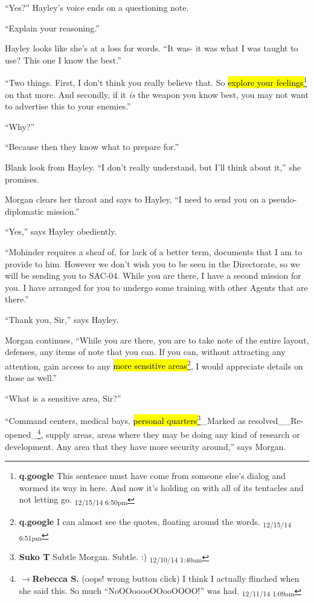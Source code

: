``Yes?'' Hayley's voice ends on a questioning note.

``Explain your reasoning.''

Hayley looks like she's at a loss for words.  ``It was- it was what I was taught to use?  This one I know the best.''

``Two things.  First, I don't think you really believe that.  So \hl{explore your feelings}\footnote{\textbf{q.google }This sentence must have come from someone else's dialog and wormed its way in here.  And now it's holding on with all of its tentacles and not letting go. \textsubscript{12/15/14 6:50pm}} on that more.  And secondly, if it \textit{is} the weapon you know best, you may not want to advertise this to your enemies.'' 

``Why?''

``Because then they know what to prepare for.''

Blank look from Hayley.  ``I don't really understand, but I'll think about it,'' she promises.



Morgan clears her throat and says to Hayley, ``I need to send you on a pseudo-diplomatic mission.''

``Yes,'' says Hayley obediently.

``Mohinder requires a sheaf of, for lack of a better term, documents that I am to provide to him.  However we don't wish you to be seen in the Directorate, so we will be sending you to SAC-04.  While you are there, I have a second mission for you.  I have arranged for you to undergo some training with other Agents that are there.''

``Thank you, Sir,'' says Hayley.

Morgan continues, ``While you are there, you are to take note of the entire layout, defenses, any items of note that you can.  If you can, without attracting any attention, gain access to any \hl{more sensitive areas}\footnote{\textbf{q.google }I can almost see the quotes, floating around the words. \textsubscript{12/15/14 6:51pm}}, I would appreciate details on those as well.''

``What is a sensitive area, Sir?''

``Command centers, medical bays, \hl{personal quarters}\footnote{\textbf{Suko T }Subtle Morgan.  Subtle. :) \textsubscript{12/10/14 1:40am}}\_Marked as resolved\_\_Re-opened\_\footnote{$\rightarrow$\textbf{Rebecca S. }(oops! wrong button click)
I think I actually flinched when she said this. So much ``NoOOooooOOooOOOO!'' was had. \textsubscript{12/11/14 1:09am}}, supply areas, areas where they may be doing any kind of research or development.  Any area that they have more security around,'' says Morgan.

